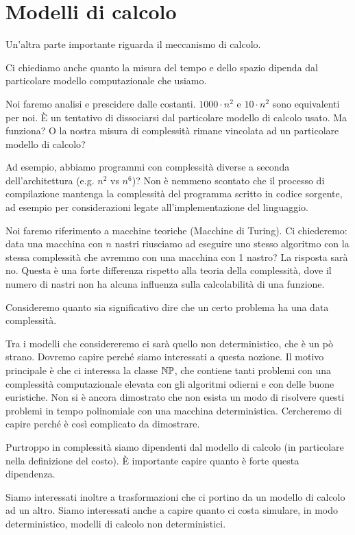\section{Modelli di calcolo}

Un'altra parte importante riguarda il meccanismo di calcolo.

Ci chiediamo anche quanto la misura del tempo e dello spazio dipenda dal particolare modello
computazionale che usiamo.

Noi faremo analisi e prescidere dalle costanti. $1000\cdot n^{2}$ e $10\cdot n^{2}$ sono equivalenti per noi.
È un tentativo di dissociarsi dal particolare modello di calcolo usato. Ma funziona? O la nostra
misura di complessità rimane vincolata ad un particolare modello di calcolo?

Ad esempio, abbiamo programmi con complessità diverse a seconda dell'architettura (e.g. $n^{2}$ vs
$n^{6}$)? Non è nemmeno scontato che il processo di compilazione mantenga la complessità del
programma scritto in codice sorgente, ad esempio per considerazioni legate all'implementazione del
linguaggio.

Noi faremo riferimento a macchine teoriche (Macchine di Turing). Ci chiederemo: data una macchina
con $n$ nastri riusciamo ad eseguire uno stesso algoritmo con la stessa complessità che avremmo con
una macchina con 1 nastro? La risposta sarà no. Questa è una forte differenza rispetto alla teoria
della complessità, dove il numero di nastri non ha alcuna influenza sulla calcolabilità di una
funzione.

Consideremo quanto sia significativo dire che un certo problema ha una data complessità.

Tra i modelli che considereremo ci sarà quello non deterministico, che è un pò strano. Dovremo
capire perché siamo interessati a questa nozione. Il motivo principale è che ci interessa la classe
$\mathbb{NP}$, che contiene tanti problemi con una complessità computazionale elevata con gli algoritmi
odierni e con delle buone euristiche. Non si è ancora dimostrato che non esista un modo di risolvere
questi problemi in tempo polinomiale con una macchina deterministica. Cercheremo di capire perché è
così complicato da dimostrare.

Purtroppo in complessità siamo dipendenti dal modello di calcolo (in particolare nella definizione
del costo). È importante capire quanto è forte questa dipendenza.

Siamo interessati inoltre a trasformazioni che ci portino da un modello di calcolo ad un altro.
Siamo interessati anche a capire quanto ci costa simulare, in modo deterministico, modelli di
calcolo non deterministici.

